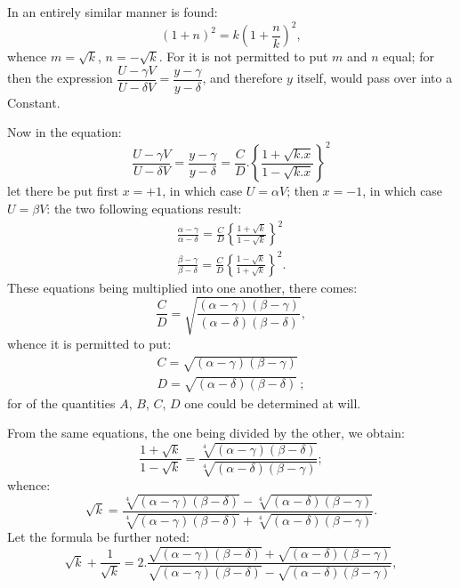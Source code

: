 \documentclass{article}
\begin{document}

In an entirely similar manner is found:
\[
(1+n)^{2}=k\left(1+\frac{n}{k}\right)^{2},
\]
whence $m=\sqrt{k}$, $n=-\sqrt{k}$. For it is not permitted to put $m$ and $n$ equal; for then the expression $\dfrac{U-\gamma V}{U-\delta V}=\dfrac{y-\gamma}{y-\delta}$, and therefore $y$ itself, would pass over into a Constant.

Now in the equation:
\[
\frac{U-\gamma V}{U-\delta V}=\frac{y-\gamma}{y-\delta}=\frac{C}{D}.\left\{\frac{1+\sqrt{k.x}}{1-\sqrt{k.x}}\right\}^{2}
\]
let there be put first $x=+1$, in which case $U=\alpha V$; then $x=-1$, in which case $U=\beta V$: the two following equations result:
\[
\begin{gathered}
\frac{\alpha-\gamma}{\alpha-\delta}=\frac{C}{D}\left\{\frac{1+\sqrt{k}}{1-\sqrt{k}}\right\}^{2}\\
\frac{\beta-\gamma}{\beta-\delta}=\frac{C}{D}\left\{\frac{1-\sqrt{k}}{1+\sqrt{k}}\right\}^{2}.
\end{gathered}
\]
These equations being multiplied into one another, there comes:
\[
\frac{C}{D}=\sqrt{\frac{(\alpha-\gamma)(\beta-\gamma)}{(\alpha-\delta)(\beta-\delta)}},
\]
whence it is permitted to put:
\[
\begin{gathered}
C=\sqrt{(\alpha-\gamma)(\beta-\gamma)}\\
D=\sqrt{(\alpha-\delta)(\beta-\delta)}\ ;
\end{gathered}
\]
for of the quantities $A$, $B$, $C$, $D$ one could be determined at will.

From the same equations, the one being divided by the other, we obtain:
\[
\frac{1+\sqrt{k}}{1-\sqrt{k}}=\frac{\sqrt[4]{(\alpha-\gamma)(\beta-\delta)}}{\sqrt[4]{(\alpha-\delta)(\beta-\gamma)}};
\]
whence:
\[
\sqrt{k}=\frac{\sqrt[4]{(\alpha-\gamma)(\beta-\delta)}-\sqrt[4]{(\alpha-\delta)(\beta-\gamma)}}{\sqrt[4]{(\alpha-\gamma)(\beta-\delta)}+\sqrt[4]{(\alpha-\delta)(\beta-\gamma)}}.
\]
Let the formula be further noted:
\[
\sqrt{k}+\frac{1}{\sqrt{k}}=2.\frac{\sqrt{(\alpha-\gamma)(\beta-\delta)}+\sqrt{(\alpha-\delta)(\beta-\gamma)}}{\sqrt{(\alpha-\gamma)(\beta-\delta)}-\sqrt{(\alpha-\delta)(\beta-\gamma)}},
\]

\end{document}

